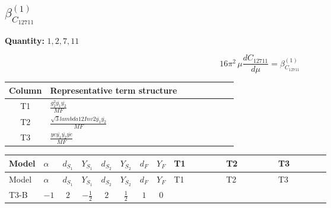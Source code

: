 \documentclass[8pt]{article}
\begin{document}
\begin{landscape}
\section*{$\beta_{C_{12711}}^{(1)}$}
\noindent\textbf{Quantity: }$\mathrm{1,2,7,11}$\par\smallskip
\[16\pi^2\,\mu\frac{d C_{12711}}{d\mu}=\beta_{C_{12711}}^{(1)}\]
\begin{center}
\begin{tabular}{@{}c >{\raggedright\arraybackslash}p{0.82\linewidth}@{}}
\toprule
Column & Representative term structure \\
\midrule
T1 & \(\displaystyle \frac{g_{2}^{2} \overline{y_{1}} \overline{y_{2}}}{MF}\) \\
\midrule
T2 & \(\displaystyle \frac{\sqrt{3} lambda12Inv2 \overline{y_{1}} \overline{y_{2}}}{MF}\) \\
\midrule
T3 & \(\displaystyle \frac{ye \overline{y_{1}} \overline{y_{2}} \overline{ye}}{MF}\) \\
\midrule
\bottomrule
\end{tabular}
\end{center}
\smallskip
\tiny
\begin{longtable}{@{}llcccccc >{\raggedright\arraybackslash}p{0.21\linewidth} >{\raggedright\arraybackslash}p{0.21\linewidth} >{\raggedright\arraybackslash}p{0.21\linewidth}@{}}
\toprule
Model & $\alpha$ & $d_{S_1}$ & $Y_{S_1}$ & $d_{S_2}$ & $Y_{S_2}$ & $d_F$ & $Y_F$ & T1 & T2 & T3 \\
\midrule
\endfirsthead
\toprule
Model & $\alpha$ & $d_{S_1}$ & $Y_{S_1}$ & $d_{S_2}$ & $Y_{S_2}$ & $d_F$ & $Y_F$ & T1 & T2 & T3 \\
\midrule
\endhead
T3-B & $-1$ & $2$ & $-\frac{1}{2}$ & $2$ & $\frac{1}{2}$ & $1$ & $0$ & \scriptsize\adjustbox{max width=\linewidth}{$\begin{gathered} - \frac{3 g_{2}^{2} \overline{y_{1}} \overline{y_{2}}}{8 MF}\end{gathered}$} & \scriptsize\adjustbox{max width=\linewidth}{$\begin{gathered} - \frac{\sqrt{3} lambda12Inv2 \overline{y_{1}} \overline{y_{2}}}{6 MF}\end{gathered}$} & \scriptsize\adjustbox{max width=\linewidth}{$\begin{gathered} \frac{ye \overline{y_{1}} \overline{y_{2}} \overline{ye}}{8 MF}\end{gathered}$} \\
\midrule
\bottomrule
\end{longtable}
\clearpage

\end{landscape}
\end{document}
